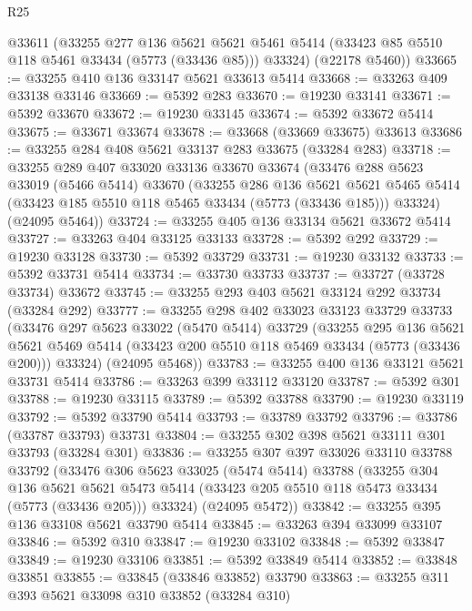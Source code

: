 \begin{lexlean}{R25}
\begin{coremodule}
      @33611
      (@33255
        @277
        @136
        @5621
        @5621
        @5461
        @5414
        (@33423 @85 @5510 @118 @5461 @33434 (@5773 (@33436 @85)))
        @33324)
      (@22178 @5460))
@33665 := @33255 @410 @136 @33147 @5621 @33613 @5414
@33668 := @33263 @409 @33138 @33146
@33669 := @5392 @283
@33670 := @19230 @33141
@33671 := @5392 @33670
@33672 := @19230 @33145
@33674 := @5392 @33672 @5414
@33675 := @33671 @33674
@33678 := @33668 (@33669 @33675) @33613
@33686 := @33255 @284 @408 @5621 @33137 @283 @33675 (@33284 @283)
@33718 := @33255
    @289
    @407
    @33020
    @33136
    @33670
    @33674
    (@33476
      @288
      @5623
      @33019
      (@5466 @5414)
      @33670
      (@33255
        @286
        @136
        @5621
        @5621
        @5465
        @5414
        (@33423 @185 @5510 @118 @5465 @33434 (@5773 (@33436 @185)))
        @33324)
      (@24095 @5464))
@33724 := @33255 @405 @136 @33134 @5621 @33672 @5414
@33727 := @33263 @404 @33125 @33133
@33728 := @5392 @292
@33729 := @19230 @33128
@33730 := @5392 @33729
@33731 := @19230 @33132
@33733 := @5392 @33731 @5414
@33734 := @33730 @33733
@33737 := @33727 (@33728 @33734) @33672
@33745 := @33255 @293 @403 @5621 @33124 @292 @33734 (@33284 @292)
@33777 := @33255
    @298
    @402
    @33023
    @33123
    @33729
    @33733
    (@33476
      @297
      @5623
      @33022
      (@5470 @5414)
      @33729
      (@33255
        @295
        @136
        @5621
        @5621
        @5469
        @5414
        (@33423 @200 @5510 @118 @5469 @33434 (@5773 (@33436 @200)))
        @33324)
      (@24095 @5468))
@33783 := @33255 @400 @136 @33121 @5621 @33731 @5414
@33786 := @33263 @399 @33112 @33120
@33787 := @5392 @301
@33788 := @19230 @33115
@33789 := @5392 @33788
@33790 := @19230 @33119
@33792 := @5392 @33790 @5414
@33793 := @33789 @33792
@33796 := @33786 (@33787 @33793) @33731
@33804 := @33255 @302 @398 @5621 @33111 @301 @33793 (@33284 @301)
@33836 := @33255
    @307
    @397
    @33026
    @33110
    @33788
    @33792
    (@33476
      @306
      @5623
      @33025
      (@5474 @5414)
      @33788
      (@33255
        @304
        @136
        @5621
        @5621
        @5473
        @5414
        (@33423 @205 @5510 @118 @5473 @33434 (@5773 (@33436 @205)))
        @33324)
      (@24095 @5472))
@33842 := @33255 @395 @136 @33108 @5621 @33790 @5414
@33845 := @33263 @394 @33099 @33107
@33846 := @5392 @310
@33847 := @19230 @33102
@33848 := @5392 @33847
@33849 := @19230 @33106
@33851 := @5392 @33849 @5414
@33852 := @33848 @33851
@33855 := @33845 (@33846 @33852) @33790
@33863 := @33255 @311 @393 @5621 @33098 @310 @33852 (@33284 @310)

\end{coremodule}
\end{lexlean}
